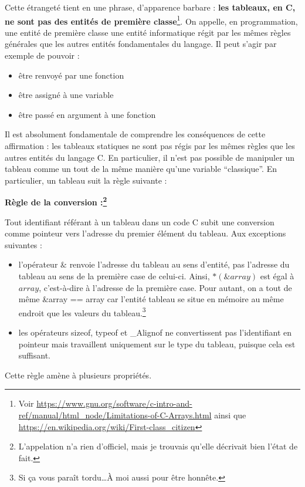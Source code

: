 \documentclass[../../../main.tex]{subfiles}
\begin{document}
Cette étrangeté tient en une phrase, d'apparence barbare : \textbf{les tableaux, en C, ne sont pas des entités de première classe}\footnote{Voir \url{https://www.gnu.org/software/c-intro-and-ref/manual/html_node/Limitations-of-C-Arrays.html} ainsi que \url{https://en.wikipedia.org/wiki/First-class_citizen}}. On appelle, en programmation, une entité de première classe une entité informatique régit par les mêmes règles générales que les autres entités fondamentales du langage. Il peut s'agir par exemple de pouvoir :
\begin{itemize}
	\item être renvoyé par une fonction
	\item être assigné à une variable
	\item être passé en argument à une fonction
\end{itemize} 
Il est absolument fondamentale de comprendre les conséquences de cette affirmation : les tableaux statiques ne sont pas régis par les mêmes règles que les autres entités du langage C. En particulier, il n'est pas possible de manipuler un tableau comme un tout de la même manière qu'une variable ``classique''. En particulier, un tableau suit la règle suivante :
 
\textbf{Règle de la conversion :\footnote{L'appelation n'a rien d'officiel, mais je trouvais qu'elle décrivait bien l'état de fait.}}
 
Tout identifiant référant à un tableau dans un code C subit une conversion comme pointeur vers l'adresse du premier élément du tableau. Aux exceptions suivantes :
\begin{itemize}
	\item l'opérateur $\&$ renvoie l'adresse du tableau au sens d'entité, pas l'adresse du tableau au sens de la première case de celui-ci. Ainsi, $*(\&array)$ est égal à $array$, c'est-à-dire à l'adresse de la première case. Pour autant, on a tout de même \textsf{\&array == array} car l'entité tableau se situe en mémoire au même endroit que les valeurs du tableau.\footnote{Si ça vous paraît tordu\dots À moi aussi pour être honnête.}
	\item les opérateurs \textsf{sizeof}, \textsf{typeof} et \textsf{\_Alignof} ne convertissent pas l'identifiant en pointeur mais travaillent uniquement sur le type du tableau, puisque cela est suffisant.
\end{itemize}
Cette règle amène à plusieurs propriétés.
\end{document}
